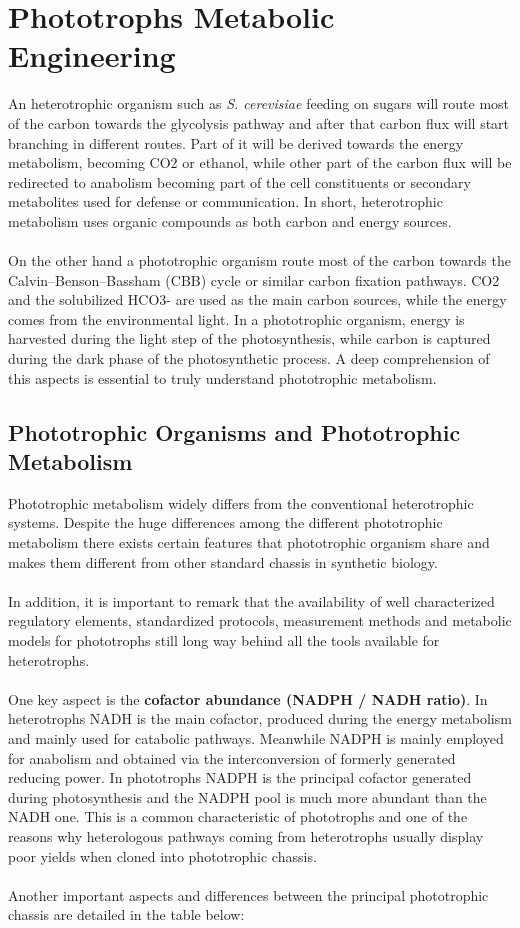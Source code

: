 \section{Phototrophs Metabolic Engineering}
An heterotrophic organism such as \textit{S. cerevisiae} feeding on sugars will route most of the carbon towards the glycolysis pathway and after that carbon flux will start branching in different routes. Part of it will be derived towards the energy metabolism, becoming CO2 or ethanol, while other part of the carbon flux will be redirected to anabolism becoming part of the cell constituents or secondary metabolites used for defense or communication. In short, heterotrophic metabolism uses organic compounds as both carbon and energy sources. \\ \\
On the other hand a phototrophic organism route most of the carbon towards the Calvin–Benson–Bassham (CBB) cycle or similar carbon fixation pathways. CO2 and the solubilized HCO3- are used as the main carbon sources, while the energy comes from the environmental light. In a phototrophic organism, energy is harvested during the light step of the photosynthesis, while carbon is captured during the dark phase of the photosynthetic process. A deep comprehension of this aspects is essential to truly understand phototrophic metabolism.
\subsection{Phototrophic Organisms and Phototrophic Metabolism}
Phototrophic metabolism widely differs from the conventional heterotrophic systems. Despite the huge differences among the different phototrophic metabolism there exists certain features that phototrophic organism share and makes them different from other standard chassis in synthetic biology. \\ \\
In addition, it is important to remark that the availability of well characterized regulatory elements, standardized protocols, measurement methods and metabolic models for phototrophs still long way behind all the tools available for heterotrophs. \\ \\
One key aspect is the \textbf{cofactor abundance (NADPH / NADH ratio)}. In heterotrophs NADH is the main cofactor, produced during the energy metabolism and mainly used for catabolic pathways. Meanwhile NADPH is mainly employed for anabolism and obtained via the interconversion of formerly generated reducing power. In phototrophs NADPH is the principal cofactor generated during photosynthesis and the NADPH pool is much more abundant than the NADH one. This is a common characteristic of phototrophs and one of the reasons why heterologous pathways coming from heterotrophs usually display poor yields when cloned into phototrophic chassis. \\ \\
Another important aspects and differences between the principal phototrophic chassis are detailed in the table below:


